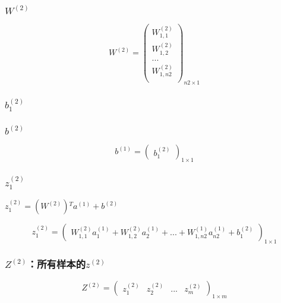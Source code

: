 \documentclass[
]{article}
\begin{document}
\hypertarget{header-n32}{%
\subsubsection{\texorpdfstring{\(W^{(2)}\)}{W\^{}\{(2)\}}}\label{header-n32}}

\[W^{(2)} = {
    \begin{pmatrix}
     W^{(2)}_{1,1} \\
     W^{(2)}_{1,2} \\
     ...\\
     W^{(2)}_{1,n2} \\
    \end{pmatrix}
  }_{n2×1}\]

\hypertarget{header-n34}{%
\subsubsection{\texorpdfstring{\(b^{(2)}_{1}\)}{b\^{}\{(2)\}\_\{1\}}}\label{header-n34}}

\hypertarget{header-n35}{%
\subsubsection{\texorpdfstring{\(b^{(2)}\)}{b\^{}\{(2)\}}}\label{header-n35}}

\[b^{(1)} = {\begin{pmatrix}
  b^{(2)}_{1}
\end{pmatrix}}_{1×1}\]

\hypertarget{header-n37}{%
\subsubsection{\texorpdfstring{\(z^{(2)}_{1}\)}{z\^{}\{(2)\}\_\{1\}}}\label{header-n37}}

\(z^{(2)}_{1} = (W^{(2)}){^T}a^{(1)}+b^{(2)}\)

\[z^{(2)}_{1}
={\begin{pmatrix}
  W^{(2)}_{1,1}a^{(1)}_{1} + W^{(2)}_{1,2}a^{(1)}_{2} + ... + W^{(1)}_{1,n2}a^{(1)}_{n2}+b^{(2)}_{1}
\end{pmatrix}}_{1×1}\]

\hypertarget{header-n40}{%
\subsubsection{\texorpdfstring{\(Z^{(2)}\)：所有样本的\(z^{(2)}\)}{Z\^{}\{(2)\}：所有样本的z\^{}\{(2)\}}}\label{header-n40}}

\[Z^{(2)}={\begin{pmatrix}
  z^{(2)}_{1} & z^{(2)}_{2} & ... & z^{(2)}_{m}
\end{pmatrix}}_{1×m}\]
\end{document}
